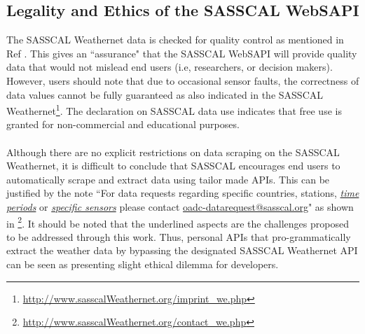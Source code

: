 \documentclass[a4paper, 10pt, conference]{ieeeconf}      %
\begin{document}
\subsection{\textbf{Legality and Ethics of the SASSCAL WebSAPI}}
\noindent
 The SASSCAL Weathernet data is checked for quality control as mentioned in Ref \cite{kaspar2015sasscal}.  This gives an ``assurance" that the SASSCAL WebSAPI will provide   quality data that would not mislead end users (i.e, researchers, or decision makers). However, users should note that due to occasional sensor faults, the correctness of  data values cannot be fully guaranteed as also indicated in the SASSCAL Weathernet\footnote{\url{http://www.sasscalWeathernet.org/imprint_we.php}}.  The declaration on SASSCAL data use  indicates that free use   is granted for non-commercial and educational purposes. %
 \\
\\
Although there are no explicit restrictions on data scraping on the SASSCAL Weathernet,  it   is difficult to conclude that   SASSCAL encourages   end users to  automatically scrape and extract data using tailor made APIs. 
 This can be justified by the note ``For data requests regarding specific countries, stations, \emph{\underline{time periods}} or \emph{\underline{specific sensors}} please contact \url{oadc-datarequest@sasscal.org}" as shown in \footnote{\url{http://www.sasscalWeathernet.org/contact_we.php}}. It should be noted that the underlined aspects are the challenges proposed to be addressed through  this work. Thus, personal APIs that pro-grammatically extract the weather data by bypassing the designated SASSCAL Weathernet API can be seen as presenting  slight ethical dilemma for developers.
 
\end{document}
